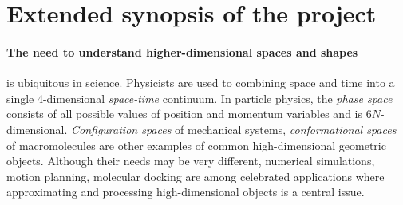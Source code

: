 \section{Extended synopsis of the project}

\paragraph{The need to understand higher-dimensional spaces and shapes}


is ubiquitous in science.  Physicists are used to combining space and time into a single 4-dimensional {\em space-time} continuum.  In particle physics, the {\em phase space} consists of all possible values of position and momentum variables and is $6N$-dimensional.  {\em Configuration spaces} of mechanical systems, {\em conformational spaces} of macromolecules are other examples of common high-dimensional geometric objects.  Although their needs may be very different, numerical simulations, motion planning, molecular docking are among celebrated applications where approximating and processing high-dimensional objects is a central issue. 

